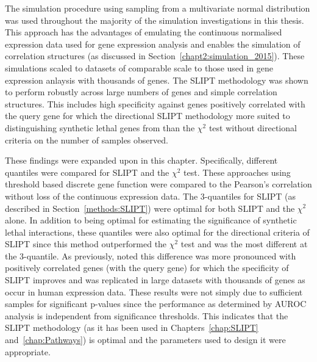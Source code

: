 The simulation procedure using sampling from a multivariate normal distribution was used throughout the majority of the simulation investigations in this thesis. This approach has the advantages of emulating the continuous normalised expression data used for gene expression analysis and enables the simulation of correlation structures (as discussed in Section~\ref{chapt2:simulation_2015}). These simulations scaled to datasets of comparable scale to those used in gene expression anlaysis with thousands of genes. The \gls{SLIPT} methodology was shown to perform robustly across large numbers of genes and simple correlation structures. This includes high specificity against genes positively correlated with the query gene for which the directional \gls{SLIPT} methodology more suited to distinguishing synthetic lethal genes from than the $\chi^2$ test without directional criteria on the number of samples observed.

These findings were expanded upon in this chapter. Specifically, different quantiles were compared for \gls{SLIPT} and the $\chi^2$ test. These approaches using threshold based discrete gene function were compared to the Pearson's correlation without loss of the continuous expression data. The 3-quantiles for \gls{SLIPT} (as described in Section~\ref{methods:SLIPT}) were optimal for both \gls{SLIPT} and the $\chi^2$ alone. In addition to being optimal for estimating the significance of synthetic lethal interactions, these quantiles were also optimal for the directional criteria of \gls{SLIPT} since this method outperformed the $\chi^2$ test and was the most different at the 3-quantile. As previously, noted this difference was more pronounced with positively correlated genes (with the query gene) for which the specificity of \gls{SLIPT} improves and was replicated in large datasets with thousands of genes as occur in human expression data. These results were not simply due to sufficient samples for significant p-values since the performance as determined by \gls{AUROC} analysis is independent from significance thresholds. This indicates that the \gls{SLIPT} methodology (as it has been used in Chapters~\ref{chap:SLIPT} and~\ref{chap:Pathways}) is optimal and the parameters used to design it were appropriate.

